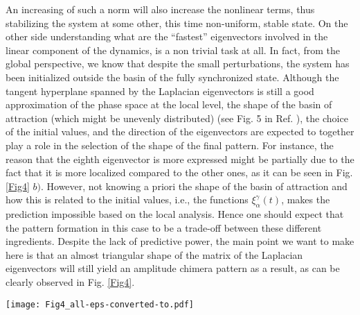 \documentclass[prx,twocolumn,amsmath,noshowkeys,noshowpacs,amssymb]{revtex4-2}
\begin{document}
An increasing of such a norm will also increase the nonlinear terms, thus stabilizing the system at some other, this time non-uniform, stable state. On the other side understanding what are the ``fastest'' eigenvectors involved in the linear component of the dynamics, is a non trivial task at all. In fact, from the global perspective, we know that despite the small perturbations, the system has been initialized outside the basin of the fully synchronized state. Although the tangent hyperplane spanned by the Laplacian eigenvectors is still a good approximation of the phase space at the local level, the shape of the basin of attraction (which might be unevenly distributed) (see Fig.  5 in Ref. \cite{Muolo2021}), the choice of the initial values, and the direction of the eigenvectors are expected to together play a role in the selection of the shape of the final pattern. For instance, the reason that the eighth eigenvector is more expressed might be partially due to the fact that it is more localized compared to the other ones, as it can be seen in Fig. \ref{Fig4} $b)$. However, not knowing a priori the shape of the basin of attraction and how this is related to the initial values, i.e., the functions $\xi_{\alpha}^{\gamma}(t)$, makes the prediction impossible based on the local analysis. Hence one should expect that the pattern formation in this case to be a trade-off between these different ingredients. Despite the lack of predictive power, the main point we want to make here is that an almost triangular shape of the matrix of the Laplacian eigenvectors will still yield an amplitude chimera pattern as a result, as can be clearly observed in Fig. \ref{Fig4}.  

\begin{figure*}%
	\centering
	\texttt{[image: Fig4\_all-eps-converted-to.pdf]}
	\caption{\textbf{Non-normality driven chimera patterns.} $\textbf{a)}$ The Master Stability Function (red stars) for the \textit{dominance among macaques} network \cite{ref31}. The most expressed eigenvalue correspond to the eigth eigenvector which is clearly farer from the threshold of instability than other modes. $\textbf{b)}$ Comparison between the most expressed eigenvector (magenta stars) and the normalized amplitudes of the initial evolution (blue circles) and the final pattern (green diamonds). Notice that although quantitatively very similar the comparison is less neat than previously. $\textbf{c)}$ The time series for each nodes where due to many nodes involved it is almost impossible to establish the shape of the pattern obtained. $\textbf{d)}$ The colormap representation of the evolution of the amplitude chimera state where the colorbar quantifies the magnitude of the patterns. The parameters for the Brusselator model are $b=2.5$, $c=1$, $D_u=0.007$, and $D_v=0.083$.}
	\label{Fig4}
\end{figure*}
\end{document}
